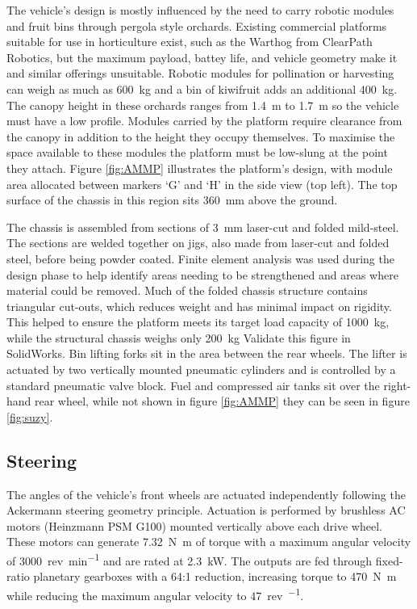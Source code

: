 \documentclass[preprint,authoryear,12pt]{elsarticle}
\begin{document}
        The vehicle's design is mostly influenced by the need to carry robotic modules and fruit bins through pergola style orchards.
        Existing commercial platforms suitable for use in horticulture exist, such as the Warthog from ClearPath Robotics, but the maximum payload, battey life, and vehicle geometry make it and similar offerings unsuitable.
        Robotic modules for pollination or harvesting can weigh as much as \SI{600}{\kilo\gram} and a bin of kiwifruit adds an additional \SI{400}{\kilo\gram}.
        The canopy height in these orchards ranges from \SI{1.4}{\meter} to \SI{1.7}{\meter} so the vehicle must have a low profile.
        Modules carried by the platform require clearance from the canopy in addition to the height they occupy themselves.
        To maximise the space available to these modules the platform must be low-slung at the point they attach.
        Figure \ref{fig:AMMP} illustrates the platform's design, with module area allocated between markers `G' and `H' in the side view (top left).
        The top surface of the chassis in this region sits \SI{360}{\milli\meter} above the ground.

        The chassis is assembled from sections of \SI{3}{\milli\meter} laser-cut and folded mild-steel.
        The sections are welded together on jigs, also made from laser-cut and folded steel, before being powder coated.
        Finite element analysis was used during the design phase to help identify areas needing to be strengthened and areas where material could be removed.
        Much of the folded chassis structure contains triangular cut-outs, which reduces weight and has minimal impact on rigidity.
        This helped to ensure the platform meets its target load capacity of \SI{1000}{\kilo\gram}, while the structural chassis weighs only \SI{200}{\kilo\gram} \color{red}Validate this figure in SolidWorks\color{black}.
        Bin lifting forks sit in the area between the rear wheels.
        The lifter is actuated by two vertically mounted pneumatic cylinders and is controlled by a standard pneumatic valve block.
        Fuel and compressed air tanks sit over the right-hand rear wheel, while not shown in figure \ref{fig:AMMP} they can be seen in figure \ref{fig:suzy}.

    \subsection{Steering}
    \label{sub:steering}

        The angles of the vehicle's front wheels are actuated independently following the Ackermann steering geometry principle.
        Actuation is performed by brushless AC motors (Heinzmann PSM G100) mounted vertically above each drive wheel.
        These motors can generate \SI{7.32}{\newton\meter} of torque with a maximum angular velocity of \SI{3000}{rev\per\minute} and are rated at \SI{2.3}{\kilo\watt}.
        The outputs are fed through fixed-ratio planetary gearboxes with a 64:1 reduction, increasing torque to \SI{470}{\newton\meter} while reducing the maximum angular velocity to \SI{47}{rev\per\min}.
\end{document}
